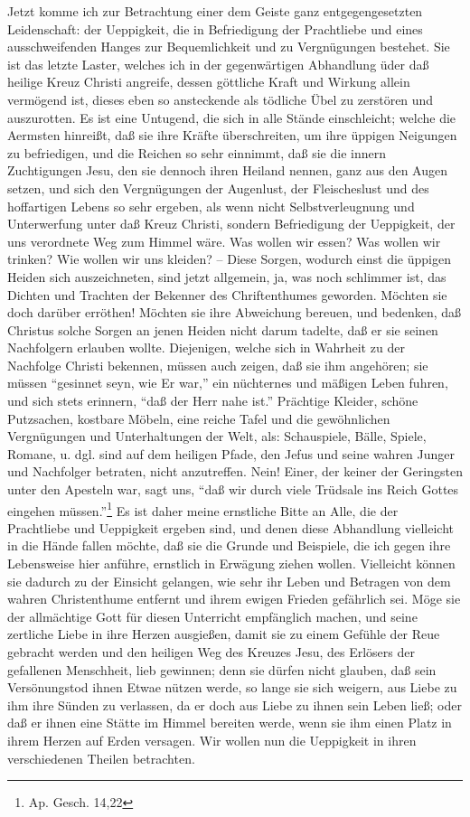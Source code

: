 Jetzt komme ich zur Betrachtung einer dem Geiste ganz entgegengesetzten Leidenschaft: der Ueppigkeit, die in Befriedigung der Prachtliebe und eines ausschweifenden Hanges zur Bequemlichkeit und zu Vergnügungen bestehet. Sie ist das letzte Laster, welches ich in der gegenwärtigen Abhandlung üder daß heilige Kreuz Christi angreife, dessen göttliche Kraft und Wirkung allein vermögend ist, dieses eben so ansteckende als tödliche Übel zu zerstören und auszurotten. Es ist eine Untugend, die sich in alle Stände einschleicht; welche die Aermsten hinreißt, daß sie ihre Kräfte überschreiten, um ihre üppigen Neigungen zu befriedigen, und die Reichen so sehr einnimmt, daß sie die innern Zuchtigungen Jesu, den sie dennoch ihren Heiland nennen, ganz aus den Augen setzen, und sich den Vergnügungen der Augenlust, der Fleischeslust und des hoffartigen Lebens so sehr ergeben, als wenn nicht Selbstverleugnung und Unterwerfung unter daß Kreuz Christi, sondern Befriedigung der Ueppigkeit, der uns verordnete Weg zum Himmel wäre. Was wollen wir essen? Was wollen wir trinken? Wie wollen wir uns kleiden? -- Diese Sorgen, wodurch einst die üppigen Heiden sich auszeichneten, sind jetzt allgemein, ja, was noch schlimmer ist, das Dichten und Trachten der Bekenner des Chriftenthumes geworden. Möchten sie doch darüber erröthen! Möchten sie ihre Abweichung bereuen, und bedenken, daß Christus solche Sorgen an jenen Heiden nicht darum tadelte, daß er sie seinen Nachfolgern erlauben wollte. Diejenigen, welche sich in Wahrheit zu der Nachfolge Christi bekennen, müssen auch zeigen, daß sie ihm angehören; sie müssen "`gesinnet seyn, wie Er war,"' ein nüchternes und mäßigen Leben fuhren, und sich stets erinnern, "`daß der Herr nahe ist."' Prächtige Kleider, schöne Putzsachen, kostbare Möbeln, eine reiche Tafel und die gewöhnlichen Vergnügungen und Unterhaltungen der Welt, als: Schauspiele, Bälle, Spiele, Romane, u. dgl. sind auf dem heiligen Pfade, den Jefus und seine wahren Junger und Nachfolger betraten, nicht anzutreffen. Nein! Einer, der keiner der Geringsten unter den Apesteln war, sagt uns, "`daß wir durch viele Trüdsale ins Reich Gottes eingehen müssen."'\footnote{Ap. Gesch. 14,22} Es ist daher meine ernstliche Bitte an Alle, die der Prachtliebe und Ueppigkeit ergeben sind, und denen diese Abhandlung vielleicht in die Hände fallen möchte, daß sie die Grunde und Beispiele, die ich gegen ihre Lebensweise hier anführe, ernstlich in Erwägung ziehen wollen. Vielleicht können sie dadurch zu der Einsicht gelangen, wie sehr ihr Leben und Betragen von dem wahren Christenthume entfernt und ihrem ewigen Frieden gefährlich sei. Möge sie der allmächtige Gott für diesen Unterricht empfänglich machen, und seine zertliche Liebe in ihre Herzen ausgießen, damit sie zu einem Gefühle der Reue gebracht werden und den heiligen Weg des Kreuzes Jesu, des Erlösers der gefallenen Menschheit, lieb gewinnen; denn sie dürfen nicht glauben, daß sein Versönungstod ihnen Etwae nützen werde, so lange sie sich weigern, aus Liebe zu ihm ihre Sünden zu verlassen, da er doch aus Liebe zu ihnen sein Leben ließ; oder daß er ihnen eine Stätte im Himmel bereiten werde, wenn sie ihm einen Platz in ihrem Herzen auf Erden versagen. Wir wollen nun die Ueppigkeit in ihren verschiedenen Theilen betrachten.

